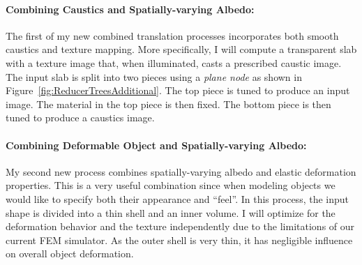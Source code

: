 \paragraph{Combining Caustics and Spatially-varying Albedo:}
The first of my new combined translation processes incorporates both smooth caustics and texture mapping.
More specifically, I will compute a transparent slab with a texture image that, when illuminated, casts a prescribed caustic image.
The input slab is split into two pieces using a \emph{plane node} as shown in Figure~\ref{fig:ReducerTreesAdditional}.
The top piece is tuned to produce an input image. The material in the top piece is then fixed. The bottom piece is then tuned to produce a caustics image.


\paragraph{Combining Deformable Object and Spatially-varying Albedo:}
My second new process combines spatially-varying albedo and elastic deformation properties.
This is a very useful combination since when modeling objects we would like to specify both their appearance and ``feel''.
In this process, the input shape is divided into a thin shell and an inner volume.
I will optimize for the deformation behavior and the texture independently due to the limitations of our current FEM simulator.
As the outer shell is very thin, it has negligible influence on overall object deformation.

